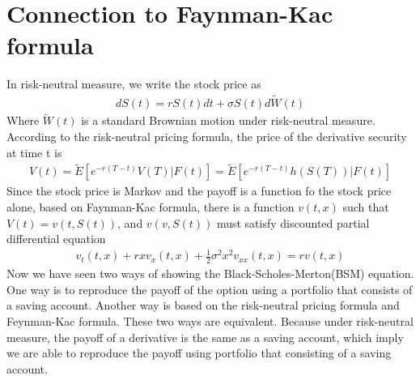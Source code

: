 \documentclass[a4paper]{article}
\begin{document}
\section{Connection to Faynman-Kac formula}
In risk-neutral measure, we write the stock price as
\begin{align*}
	dS(t) = rS(t) dt + \sigma S(t) d \tilde W(t) 
\end{align*}
Where $\tilde W(t)$ is a standard Brownian motion under risk-neutral measure.\\
According to the risk-neutral pricing formula, the price of the derivative security at time t is
\begin{align*}
	V(t) = \tilde E[e^{-r(T-t)}V(T)| F(t)] = \tilde E[e^{-r(T-t)}h(S(T))| F(t)]
\end{align*}
Since the stock price is Markov and the payoff is a function fo the stock price alone, based on Faynman-Kac formula, there is a function $v(t,x)$ such that $V(t) = v(t, S(t))$, and $v(v, S(t))$ must satisfy discounted partial differential equation 
\begin{align*}
	v_t(t,x) + rx v_x(t,x) + \frac{1}{2} \sigma^2 x^2 v_{xx}(t,x) = rv(t,x)
\end{align*}
Now we have seen two ways of showing the Black-Scholes-Merton(BSM) equation. 
One way is to reproduce the payoff of the option using a portfolio that consists of a 
saving account. Another way is based on the risk-neutral pricing formula and Feynman-Kac formula. 
These two ways are equivalent. Because under risk-neutral measure, the payoff of a derivative is the same as a saving account, which imply we are able to reproduce the payoff using portfolio that consisting of a saving account.
\end{document}

